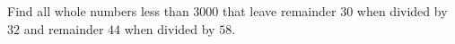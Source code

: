 Find all whole numbers less than $3000$ that leave remainder $30$ when divided by $32$ and remainder $44$ when divided by $58$.
